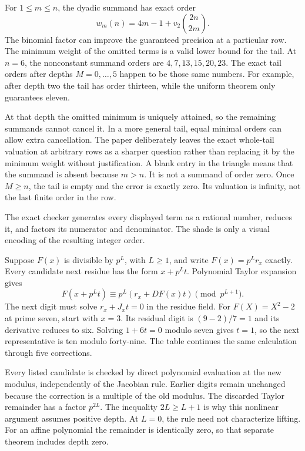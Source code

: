 For $1\le m\le n$, the dyadic summand has exact order
\[
 w_m(n)=4m-1+v_2\binom{2n}{2m}.
\]
The binomial factor can improve the guaranteed precision at a particular row. The minimum weight of the omitted terms is a valid lower bound for the tail.
At $n=6$, the nonconstant summand orders are $4,7,13,15,20,23$. The exact tail orders after depths $M=0,\ldots,5$ happen to be those same numbers. For example, after depth two the tail has order thirteen, while the uniform theorem only guarantees eleven.

At that depth the omitted minimum is uniquely attained, so the remaining summands cannot cancel it. In a more general tail, equal minimal orders can allow extra cancellation. The paper deliberately leaves the exact whole-tail valuation at arbitrary rows as a sharper question rather than replacing it by the minimum weight without justification.
A blank entry in the triangle means that the summand is absent because $m>n$. It is not a summand of order zero. Once $M\ge n$, the tail is empty and the error is exactly zero. Its valuation is infinity, not the last finite order in the row.

The exact checker generates every displayed term as a rational number, reduces it, and factors its numerator and denominator. The shade is only a visual encoding of the resulting integer order.

Suppose $F(x)$ is divisible by $p^L$, with $L\ge1$, and write $F(x)=p^Lr_x$ exactly. Every candidate next residue has the form $x+p^Lt$. Polynomial Taylor expansion gives
\[
 F(x+p^Lt)\equiv p^L(r_x+DF(x)t)\pmod{p^{L+1}}.
\]
The next digit must solve $r_x+J_xt=0$ in the residue field.
For $F(X)=X^2-2$ at prime seven, start with $x=3$. Its residual digit is $(9-2)/7=1$ and its derivative reduces to six. Solving $1+6t=0$ modulo seven gives $t=1$, so the next representative is ten modulo forty-nine. The table continues the same calculation through five corrections.

Every listed candidate is checked by direct polynomial evaluation at the new modulus, independently of the Jacobian rule. Earlier digits remain unchanged because the correction is a multiple of the old modulus.
The discarded Taylor remainder has a factor $p^{2L}$. The inequality $2L\ge L+1$ is why this nonlinear argument assumes positive depth. At $L=0$, the rule need not characterize lifting. For an affine polynomial the remainder is identically zero, so that separate theorem includes depth zero.

